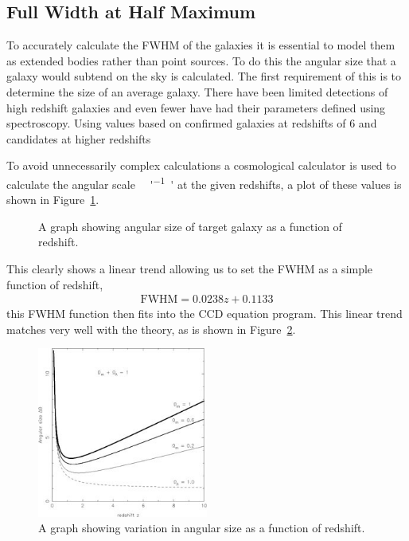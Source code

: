 
\subsection{Full Width at Half Maximum} %
\label{sub:full_width_at_half_maximum}
	To accurately calculate the FWHM of the galaxies it is essential to model them as extended bodies rather than point sources. To do this the angular size that a galaxy would subtend on the sky is calculated. The first requirement of this is to determine the size of an average galaxy. There have been limited detections of high redshift galaxies and even fewer have had their parameters defined using spectroscopy. Using values based on confirmed galaxies at redshifts of 6 and candidates at higher redshifts %

	To avoid unnecessarily complex calculations a cosmological calculator\cite{Ned_Calc} is used to calculate the angular scale \si{\kilo\parsec\per ''} at the given redshifts, a plot of these values is shown in Figure~\ref{fig:redshift_vs_angular_size}.
	\begin{figure}[!htbp]
		\centering
			\begingroup{}
				\resizebox{0.6\textwidth}{!}{%
					
				}\endgroup
		\caption{A graph showing angular size of target galaxy as a function of redshift.\label{fig:redshift_vs_angular_size}}
	\end{figure}

	This clearly shows a linear trend allowing us to set the FWHM as a simple function of redshift,
	\begin{align}
		\text{FWHM}= 0.0238z + 0.1133
	\end{align}
	this FWHM function then fits into the CCD equation program. This linear trend matches very well with the theory, as is shown in Figure~\ref{fig:angular_size_function_of_redshift}.
	\begin{figure}[!htbp]
		\centering
		\includegraphics[width=0.5\textwidth]{../Images/angular_size_function_of_redshift.jpeg}
		\caption{A graph showing variation in angular size as a function of redshift\cite{Sahni_FWHM}.\label{fig:angular_size_function_of_redshift}}
	\end{figure}

